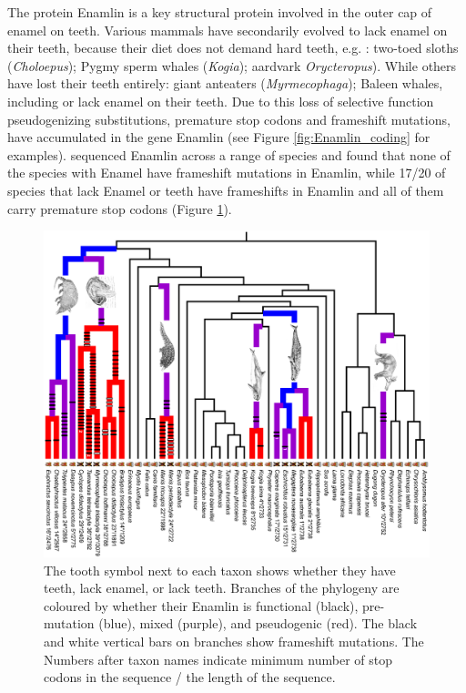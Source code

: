 The protein Enamlin is a key structural protein involved in the outer cap of enamel on teeth. Various mammals have
secondarily evolved to lack enamel on their teeth, because their diet does not
demand hard teeth, e.g. : two-toed sloths ({\it Choloepus}); Pygmy sperm whales ({\it Kogia}); aardvark 
{\it Orycteropus}). While others have lost their teeth entirely: giant anteaters ({\it Myrmecophaga}); Baleen whales, including 
or lack enamel on their teeth.
Due to this loss of selective function
pseudogenizing substitutions, premature stop codons and frameshift mutations, have
accumulated in the gene Enamlin (see Figure \ref{fig:Enamlin_coding}
for examples).  \citeauthor{Meredith:09} sequenced Enamlin across a
range of species and found that none of the species with Enamel have frameshift
mutations in Enamlin, while 17/20 of species that lack Enamel or teeth have
frameshifts in Enamlin and all of them carry premature stop codons
(Figure \ref{fig:Enamlin_phylo}). 

\begin{figure}
\begin{center}
\includegraphics[width=0.8 \textwidth]{Journal_figs/genetic_drift/Enamelin/Enamlin_phylo.pdf}
\end{center}
\caption{The tooth symbol next to each taxon shows whether they have
  teeth, lack enamel, or lack teeth. Branches of the phylogeny are coloured by whether their
  Enamlin is functional (black), pre-mutation (blue), mixed (purple),
  and pseudogenic (red). The black and white vertical bars on branches show frameshift
  mutations.  The Numbers after taxon names indicate minimum number of
  stop codons in the sequence /  the length of the sequence.} \label{fig:Enamlin_phylo}  
\end{figure} 

